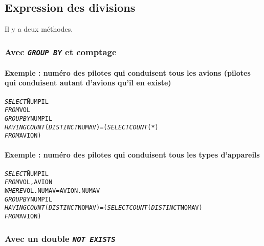 \documentclass[10pt]{article}
\begin{document}
		\subsection{Expression des divisions}
			Il y a deux méthodes.
			
			\subsubsection{Avec \emph{\texttt{GROUP BY}} et comptage}
				\paragraph{Exemple : numéro des pilotes qui conduisent tous les avions (pilotes qui conduisent autant d'avions qu'il en existe)}
					\begin{alltt}
						\begin{tabbing}
							\emph{SELECT}\= NUMPIL\\
							\emph{FROM}\> VOL\\
							\emph{GROUP BY} NUMPIL\\
							\emph{HAVING} \> \emph{COUNT}(\emph{DISTINCT} NUMAV)=(\=\emph{SELECT}\= \emph{COUNT}(*)\=\\
																				\>\>\emph{FROM}\> AVION\>)
						\end{tabbing}
					\end{alltt}
					
				\paragraph{Exemple : numéro des pilotes qui conduisent tous les types d'appareils}
					\begin{alltt}
						\begin{tabbing}
							\emph{SELECT}\= NUMPIL\\
							\emph{FROM}\> VOL, AVION\\
							\emph{WHERE}\> VOL.NUMAV=AVION.NUMAV\\
							\emph{GROUP BY} NUMPIL\\
							\emph{HAVING} \> \emph{COUNT}(\emph{DISTINCT} NOMAV)=(\=\emph{SELECT}\= \emph{COUNT}(\emph{DISTINCT} NOMAV)\=\\
																				\>\>\emph{FROM}\> AVION\>)
						\end{tabbing}
					\end{alltt}
					
			\subsubsection{Avec un double \emph{\texttt{NOT EXISTS}}}
\end{document}
